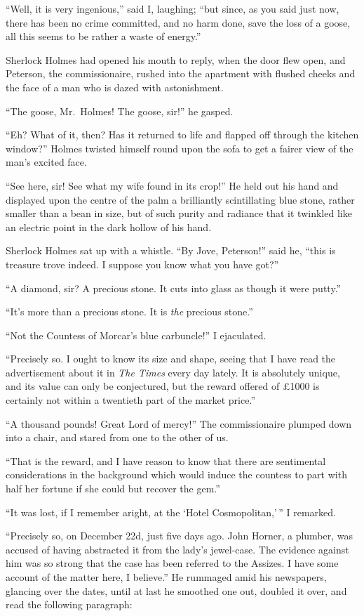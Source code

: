 “Well, it is very ingenious,” said I, laughing; “but since,
as you said just now, there has been no crime committed, and
no harm done, save the loss of a goose, all this seems to be
rather a waste of energy.”

Sherlock Holmes had opened his mouth to reply, when the
door flew open, and Peterson, the commissionaire, rush\-ed into
the apartment with flushed cheeks and the face of a man who
is dazed with astonishment.

“The goose, Mr.~Holmes! The goose, sir!” he gasped.

“Eh? What of it, then? Has it returned to life and
flapped off through the kitchen window?” Holmes twisted
himself round upon the sofa to get a fairer view of the man’s
excited face.

“See here, sir! See what my wife found in its crop!” He
held out his hand and displayed upon the centre of the palm
a brilliantly scintillating blue stone, rather smaller than a bean
in size, but of such purity and radiance that it twinkled like
an electric point in the dark hollow of his hand.

Sherlock Holmes sat up with a whistle. “By Jove, Peterson!”
said he, “this is treasure trove indeed. I suppose you
know what you have got?”

“A diamond, sir? A precious stone. It cuts into glass as
though it were putty.”

“It’s more than a precious stone. It is \textit{the} precious stone.”

“Not the Countess of Morcar’s blue carbuncle!” I
ejaculated.

“Precisely so. I ought to know its size and shape, seeing
that I have read the advertisement about it in \textit{The Times} every
day lately. It is absolutely unique, and its value can only be
conjectured, but the reward offered of £1000 is certainly not
within a twentieth part of the market price.”

“A thousand pounds! Great Lord of mercy!” The commissionaire
plumped down into a chair, and stared from one
to the other of us.

“That is the reward, and I have reason to know that there
are sentimental considerations in the background which would
induce the countess to part with half her fortune if she could
but recover the gem.”

“It was lost, if I remember aright, at the ‘Hotel Cosmopolitan,’\,”
I remarked.

“Precisely so, on December 22d, just five days ago. John
Horner, a plumber, was accused of having abstracted it from
the lady’s jewel-case. The evidence against him was so strong
that the case has been referred to the Assizes. I have some
account of the matter here, I believe.” He rummaged amid
his newspapers, glancing over the dates, until at last he
smoothed one out, doubled it over, and read the following
paragraph:

